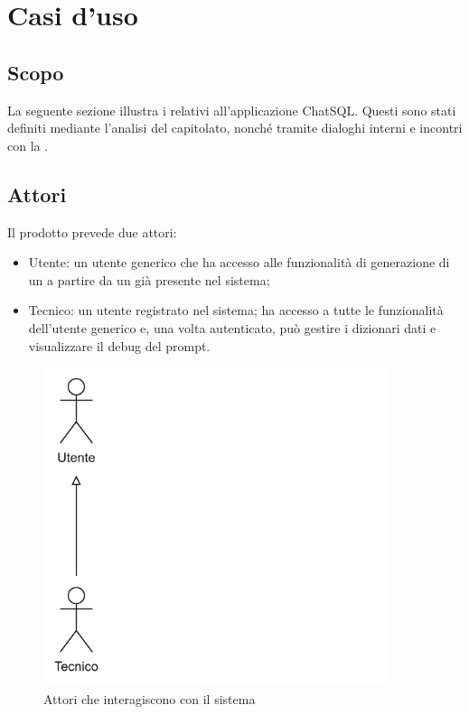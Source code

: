 \section{Casi d'uso}

\subsection{Scopo}
\par La seguente sezione illustra i  relativi all'applicazione ChatSQL. Questi sono stati definiti mediante l'analisi del capitolato, nonché tramite dialoghi interni e incontri con la .

\subsection{Attori}
\par Il prodotto prevede due attori:
\begin{itemize}
  \item Utente: un utente generico che ha accesso alle funzionalità di generazione di un  a partire da un  già presente nel sistema; 
  \item Tecnico: un utente registrato nel sistema; ha accesso a tutte le funzionalità dell'utente generico e, una volta autenticato, può gestire i dizionari dati e visualizzare il debug del prompt.
\end{itemize}

\begin{figure}[H]
  \centering
  \includegraphics[width=0.90\textwidth]{assets/attori.png}
  \caption{Attori che interagiscono con il sistema}
\end{figure}

